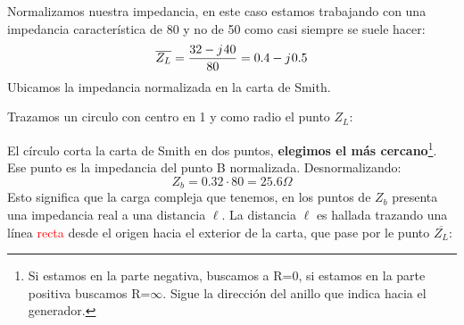 \documentclass[
	12pt, %
	fleqn, %
	a4paper, %
	oneside, %
]{LegrandOrangeBook}
\begin{document}
\begin{example}[Se tiene una $Z_L=32-\iu 40$ con una impedancia característica de $80\Omega$. Diseñe la adaptación por $\lambda/4$.]
Normalizamos nuestra impedancia, en este caso estamos trabajando con una impedancia característica de 80 y no de 50 como casi siempre se suele hacer:
\begin{displaymath}
\overline{Z_L}=\frac{32-{j\mkern1mu} 40}{80}=0.4-{j\mkern1mu} 0.5
\end{displaymath}
Ubicamos la impedancia normalizada en la carta de Smith.
\begin{center}
\end{center}
Trazamos un circulo con centro en 1 y como radio el punto $Z_L$:
\begin{center}
\end{center}
El círculo corta la carta de Smith en dos puntos, \textbf{elegimos el más cercano}\footnote{Si estamos en la parte negativa, buscamos a R=0, si estamos en la parte positiva buscamos R=$\infty$. Sigue la dirección del anillo que indica hacia el generador.}. Ese punto es la impedancia del punto B normalizada. Desnormalizando:
\begin{displaymath}
Z_b=0.32\cdot 80=25.6\Omega
\end{displaymath}
Esto significa que la carga compleja que tenemos, en los puntos de $Z_b$ presenta una impedancia real a una distancia $\ell$. La distancia $\ell$ es hallada trazando una línea \textcolor{red}{recta} desde el origen hacia el exterior de la carta, que pase por le punto $\overline{Z_L}$:

\end{example}
\end{document}
